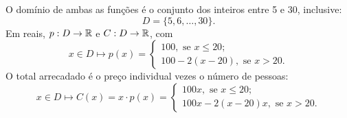 O domínio de ambas as funções é o conjunto dos inteiros entre 5 e 30, inclusive:
\[
	D=\{5,6,\ldots,30\}.
\]
Em reais, $p:D\rightarrow\mathbb{R}$ e $C:D\rightarrow\mathbb{R}$, com
\[
	x\in D\mapsto p(x)=\left\{
	\begin{array}{l}
		100,\mbox{ se }x\leq 20;\\
		100-2(x-20),\mbox{ se }x>20.
	\end{array}\right.
\]
O total arrecadado é o preço individual vezes o número de pessoas:
\[
	x\in D\mapsto C(x)=x\cdot p(x)=\left\{
	\begin{array}{l}
		100x,\mbox{ se }x\leq 20;\\
		100x-2(x-20)x,\mbox{ se }x>20.
	\end{array}\right.
\]
